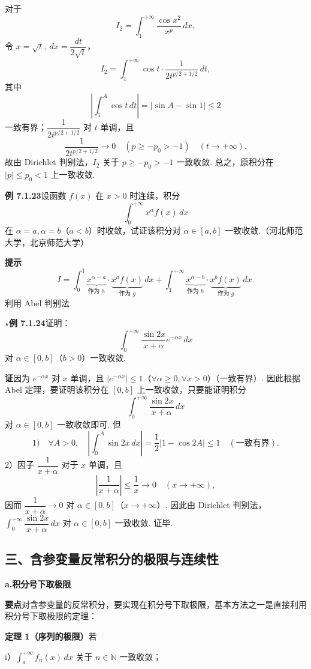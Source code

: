 \documentclass[UTF8, 12pt, fontset=fandol, oneside]{ctexart}
\begin{document}
对于
\[
I_2=\int_1^{+\infty}\frac{\cos x^2}{x^p}\,dx,
\]
令 $x=\sqrt t,\ dx=\dfrac{dt}{2\sqrt t}$，
\[
I_2=\int_1^{+\infty}\cos t\cdot\frac1{2t^{p/2+1/2}}\,dt,
\]
其中
\[
\left|\int_1^A\cos t\,dt\right|=|\sin A-\sin1|\le2
\]
一致有界；$\dfrac1{2t^{p/2+1/2}}$ 对 $t$ 单调，且
\[
\frac1{2t^{p/2+1/2}}\to0\quad(p\ge -p_0>-1)\quad(t\to+\infty).
\]
故由 Dirichlet 判别法，$I_2$ 关于 $p\ge -p_0>-1$ 一致收敛. 总之，原积分在 $|p|\le p_0<1$ 上一致收敛.

\noindent\textbf{例 7.1.23}\quad 设函数 $f(x)$ 在 $x>0$ 时连续，积分
\[
\int_0^{+\infty}x^\alpha f(x)\,dx
\]
在 $\alpha=a,\alpha=b$（$a<b$）时收敛，试证该积分对 $\alpha\in[a,b]$ 一致收敛.（河北师范大学，北京师范大学）

\noindent\textbf{提示}\quad
\[
I=\int_0^1\underbrace{x^{\alpha-a}}_{\text{作为 }h}\cdot\underbrace{x^af(x)}_{\text{作为 }g}\,dx
+\int_1^{+\infty}\underbrace{x^{\alpha-b}}_{\text{作为 }h}\cdot\underbrace{x^bf(x)}_{\text{作为 }g}\,dx.
\]
利用 Abel 判别法.

\noindent\textbf{$\star$例 7.1.24}\quad 证明：
\[
\int_0^{+\infty}\frac{\sin2x}{x+\alpha}e^{-\alpha x}\,dx
\]
对 $\alpha\in[0,b]$（$b>0$）一致收敛.

\noindent\textbf{证}\quad 因为 $e^{-\alpha x}$ 对 $x$ 单调，且 $|e^{-\alpha x}|\le1$（$\forall\alpha\ge0,\forall x>0$）（一致有界）. 因此根据 Abel 定理，要证明该积分在 $[0,b]$ 上一致收敛，只要能证明积分
\[
\int_0^{+\infty}\frac{\sin2x}{x+\alpha}\,dx
\]
对 $\alpha\in[0,b]$ 一致收敛即可. 但
\[
1)\quad \forall A>0,\quad
\left|\int_0^A\sin2x\,dx\right|
=\frac12|1-\cos2A|\le1\quad(\text{一致有界}).
\]
2）因子 $\dfrac1{x+\alpha}$ 对于 $x$ 单调，且
\[
\left|\frac1{x+\alpha}\right|\le\frac1x\to0\quad(x\to+\infty),
\]
因而 $\dfrac1{x+\alpha}\to0$ 对 $\alpha\in[0,b]$（$x\to+\infty$）. 因此由 Dirichlet 判别法，$\displaystyle\int_0^{+\infty}\dfrac{\sin2x}{x+\alpha}\,dx$ 对 $\alpha\in[0,b]$ 一致收敛. 证毕.

\subsection*{三、含参变量反常积分的极限与连续性}

\noindent\textbf{a.\quad 积分号下取极限}

\noindent\textbf{要点}\quad 对含参变量的反常积分，要实现在积分号下取极限，基本方法之一是直接利用积分号下取极限的定理：

\noindent\textbf{定理 1（序列的极限）}\quad 若

i）$\displaystyle\int_a^{+\infty}f_n(x)\,dx$ 关于 $n\in\mathbb{N}$ 一致收敛；
\end{document}
